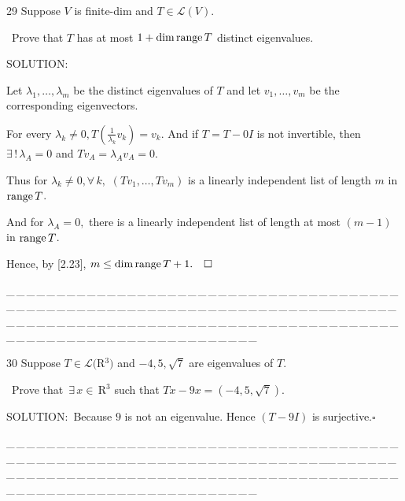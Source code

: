\documentclass[a4paper, 11pt, UTF8]{article}
\def\range{\textup{range}\,}
\def\Lm{\mathcal{L}}
\def\Rbfc{$\,{\timesbf R}$}
\begin{document}
\begin{large}
{\timesbf\Large 29} {\timessl\Large 
Suppose $V$ is finite-dim and $T\in\Lm(V)$.}\par\quad\,
{\timessl\Large Prove that $T$ has at most $1 + \dim\range T$ distinct eigenvalues.
}\par
{\timesbf S\footnotesize{OLUTION:}}\par\quad
Let $\lambda_1,\dots,\lambda_m$ be the distinct eigenvalues of $T$ and let $v_1,\dots,v_m$ be the corresponding eigenvectors.\par\quad
For every $\lambda_k\neq 0,T(\frac{1}{\lambda_k}v_k)=v_k.$ And if $T=T-0I$ is not invertible, then $\exists\,!\,\lambda_A=0$ and $Tv_A=\lambda_A v_A=0.$\par\quad
Thus for $\lambda_k\neq 0,\forall\,k,$ $(Tv_1,\dots,Tv_m)$ is a linearly independent list of length $m$ in $\range T$.\par\quad
And for $\lambda_A=0,$ there is a linearly independent list  of length at most $(m-1)$ in $\range T$.\par\quad
Hence, by [2.23], $m\leq \dim\range T+1.\quad\square$\par
{\tiny \_\,\_\,\_\,\_\,\_\,\_\,\_\,\_\,\_\,\_\,\_\,\_\,\_\,\_\,\_\,\_\,\_\,\_\,\_\,\_\,\_\,\_\,\_\,\_\,\_\,\_\,\_\,\_\,\_\,\_\,\_\,\_\,\_\,\_\,\_\,\_\,\_\,\_\,\_\,\_\,\_\,\_\,\_\,\_\,\_\,\_\,\_\,\_\,\_\,\_\,\_\,\_\,\_\,\_\,\_\,\_\,\_\,\_\,\_\,\_\,\_\,\_\,\_\,\_\,\_\,\_\,\_\,\_\,\_\,\_\,\_\_\,\_\,\_\,\_\,\_\,\_\,\_\,\_\,\_\,\_\,\_\,\_\,\_\,\_\,\_\,\_\,\_\,\_\,\_\,\_\,\_\,\_\,\_\,\_\,\_\,\_\,\_\,\_\,\_\,\_\,\_\,\_\,\_\,\_\,\_\,\_\,\_\,\_\,\_\,\_\,\_\,\_\,\_\,\_\,\_\,\_\,\_\,\_\,\_\,\_\,\_\,\_\,\_\,\_\,\_\,\_\,\_\,\_\,\_\,\_\,\_\,\_\,\_\,\_\,\_\,\_\,\_\,\_\,\_\,\_\,\_}\par

{\timesbf\Large 30} {\timessl\Large 
Suppose $T\in\Lm(${\timesbf R}$^3)$ and $-4,5,\sqrt{7}$ are eigenvalues of $T$.}\par\quad\,
{\timessl\Large Prove that $\,\exists\,x\in\Rbfc^3$ such that $Tx - 9x = (-4, 5, \sqrt{7})$.}\par
{\timesbf S\footnotesize{OLUTION:}}\,\,\,Because $9$ is not an eigenvalue. Hence $(T-9I)$ is surjective.\quad$\square$\par
{\tiny \_\,\_\,\_\,\_\,\_\,\_\,\_\,\_\,\_\,\_\,\_\,\_\,\_\,\_\,\_\,\_\,\_\,\_\,\_\,\_\,\_\,\_\,\_\,\_\,\_\,\_\,\_\,\_\,\_\,\_\,\_\,\_\,\_\,\_\,\_\,\_\,\_\,\_\,\_\,\_\,\_\,\_\,\_\,\_\,\_\,\_\,\_\,\_\,\_\,\_\,\_\,\_\,\_\,\_\,\_\,\_\,\_\,\_\,\_\,\_\,\_\,\_\,\_\,\_\,\_\,\_\,\_\,\_\,\_\,\_\,\_\_\,\_\,\_\,\_\,\_\,\_\,\_\,\_\,\_\,\_\,\_\,\_\,\_\,\_\,\_\,\_\,\_\,\_\,\_\,\_\,\_\,\_\,\_\,\_\,\_\,\_\,\_\,\_\,\_\,\_\,\_\,\_\,\_\,\_\,\_\,\_\,\_\,\_\,\_\,\_\,\_\,\_\,\_\,\_\,\_\,\_\,\_\,\_\,\_\,\_\,\_\,\_\,\_\,\_\,\_\,\_\,\_\,\_\,\_\,\_\,\_\,\_\,\_\,\_\,\_\,\_\,\_\,\_\,\_\,\_\,\_}\par


\end{large}
\end{document}
